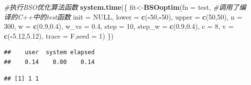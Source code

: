 \documentclass[]{ctexbook}
\newenvironment{Shaded}{\begin{snugshade}}{\end{snugshade}}
\newcommand{\KeywordTok}[1]{\textcolor[rgb]{0.13,0.29,0.53}{\textbf{#1}}}
\newcommand{\DataTypeTok}[1]{\textcolor[rgb]{0.13,0.29,0.53}{#1}}
\newcommand{\DecValTok}[1]{\textcolor[rgb]{0.00,0.00,0.81}{#1}}
\newcommand{\FloatTok}[1]{\textcolor[rgb]{0.00,0.00,0.81}{#1}}
\newcommand{\CommentTok}[1]{\textcolor[rgb]{0.56,0.35,0.01}{\textit{#1}}}
\newcommand{\OtherTok}[1]{\textcolor[rgb]{0.56,0.35,0.01}{#1}}
\newcommand{\OperatorTok}[1]{\textcolor[rgb]{0.81,0.36,0.00}{\textbf{#1}}}
\newcommand{\NormalTok}[1]{#1}
\begin{document}
\begin{Shaded}
\begin{Highlighting}[]
\CommentTok{#执行BSO优化算法函数}
\KeywordTok{system.time}\NormalTok{(\{}
\NormalTok{  fit<-}\KeywordTok{BSOoptim}\NormalTok{(}\DataTypeTok{fn =}\NormalTok{ test, }\CommentTok{#调用了编译的C++中的test函数}
                \DataTypeTok{init =} \OtherTok{NULL}\NormalTok{,}
                \DataTypeTok{lower =} \KeywordTok{c}\NormalTok{(}\OperatorTok{-}\DecValTok{50}\NormalTok{,}\OperatorTok{-}\DecValTok{50}\NormalTok{),}
                \DataTypeTok{upper =} \KeywordTok{c}\NormalTok{(}\DecValTok{50}\NormalTok{,}\DecValTok{50}\NormalTok{),}
                \DataTypeTok{n =} \DecValTok{300}\NormalTok{,}
                \DataTypeTok{w =} \KeywordTok{c}\NormalTok{(}\FloatTok{0.9}\NormalTok{,}\FloatTok{0.4}\NormalTok{),}
                \DataTypeTok{w_vs =} \FloatTok{0.4}\NormalTok{, }
                \DataTypeTok{step =} \DecValTok{10}\NormalTok{,}
                \DataTypeTok{step_w =} \KeywordTok{c}\NormalTok{(}\FloatTok{0.9}\NormalTok{,}\FloatTok{0.4}\NormalTok{),}
                \DataTypeTok{c =} \DecValTok{8}\NormalTok{,}
                \DataTypeTok{v =} \KeywordTok{c}\NormalTok{(}\OperatorTok{-}\FloatTok{5.12}\NormalTok{,}\FloatTok{5.12}\NormalTok{),}
                \DataTypeTok{trace =}\NormalTok{ F,}\DataTypeTok{seed =} \DecValTok{1}\NormalTok{)}
\NormalTok{\})}
\end{Highlighting}
\end{Shaded}

\begin{verbatim}
##    user  system elapsed 
##    0.14    0.00    0.14
\end{verbatim}

\begin{Shaded}
\end{Shaded}

\begin{verbatim}
## [1] 1 1
\end{verbatim}

\begin{Shaded}
\end{Shaded}
\end{document}

